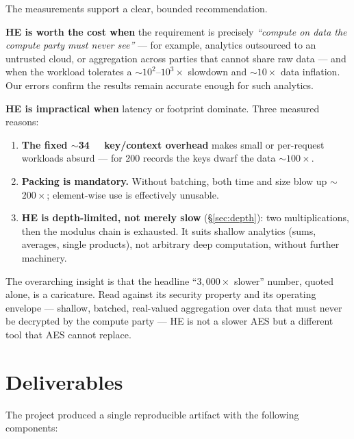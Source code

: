 \documentclass[11pt,a4paper]{article}
\begin{document}
The measurements support a clear, bounded recommendation.

\textbf{HE is worth the cost when} the requirement is precisely \emph{``compute on
data the compute party must never see''} --- for example, analytics outsourced to
an untrusted cloud, or aggregation across parties that cannot share raw data ---
and when the workload tolerates a $\sim$$10^{2}$--$10^{3}\times$ slowdown and
$\sim$$10\times$ data inflation. Our errors confirm the results remain accurate
enough for such analytics.

\textbf{HE is impractical when} latency or footprint dominate. Three measured
reasons:
\begin{enumerate}[leftmargin=1.4em,itemsep=1pt]
  \item \textbf{The fixed $\sim$\SI{34}{\mega\byte} key/context overhead} makes
    small or per-request workloads absurd --- for 200 records the keys dwarf the
    data $\sim$$100\times$.
  \item \textbf{Packing is mandatory.} Without batching, both time and size blow
    up $\sim$$200\times$; element-wise use is effectively unusable.
  \item \textbf{HE is depth-limited, not merely slow} (\S\ref{sec:depth}): two
    multiplications, then the modulus chain is exhausted. It suits shallow
    analytics (sums, averages, single products), not arbitrary deep computation,
    without further machinery.
\end{enumerate}

The overarching insight is that the headline ``$3{,}000\times$ slower'' number,
quoted alone, is a caricature. Read against its security property and its
operating envelope --- shallow, batched, real-valued aggregation over data that
must never be decrypted by the compute party --- HE is not a slower AES but a
different tool that AES cannot replace.

\section{Deliverables}

The project produced a single reproducible artifact with the following
components:
\end{document}
